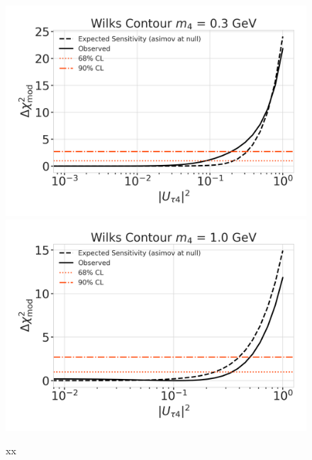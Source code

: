 \begin{figure}[h]
    \includegraphics[width=0.49\linewidth]{figures/results/best_fit/sensitivity_and_wilks_scan_0.3_GeV_with_1sigma.png}
    \includegraphics[width=0.49\linewidth]{figures/results/best_fit/sensitivity_and_wilks_scan_1.0_GeV_with_1sigma.png}
	\caption[xx]{xx}
\end{figure}

